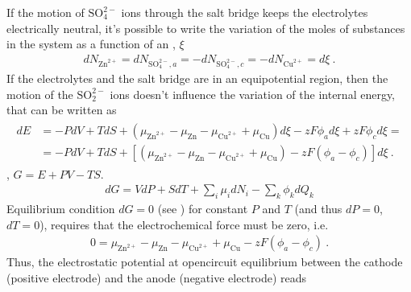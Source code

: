 \documentclass[letterpaper,10pt,english]{jupyterBook}
\begin{document}
\sphinxAtStartPar
If the motion of \(\text{SO}_4^{2-}\) ions through the salt bridge keeps the electrolytes electrically neutral, it’s possible to write the variation of the moles of substances in the system as a function of an , \(\xi\)
\begin{equation*}
\begin{split}d N_{\text{Zn}^{2+}} = d N_{\text{SO}_4^{2-}, a} = - d N_{\text{SO}_4^{2-}, c} = - dN_{\text{Cu}^{2+}} = d \xi \ .\end{split}
\end{equation*}
\sphinxAtStartPar
If the electrolytes and the salt bridge are in an equi\sphinxhyphen{}potential region, then the motion of the \(\text{SO}_2^{2-}\) ions doesn’t influence the variation of the internal energy, that can be written as
\begin{equation*}
\begin{split}\begin{aligned}
  d E
  & = - P dV + T dS + \left( \mu_{\text{Zn}^{2+}} - \mu_{\text{Zn}} - \mu_{\text{Cu}^{2+}} + \mu_{\text{Cu}} \right) d \xi - z F \phi_{a} d \xi + z F \phi_c d \xi = \\
  & = - P dV + T dS + \left[ \left( \mu_{\text{Zn}^{2+}} - \mu_{\text{Zn}} - \mu_{\text{Cu}^{2+}} + \mu_{\text{Cu}} \right) - z F \left( \phi_{a} - \phi_c \right) \right] d \xi \ .
\end{aligned}\end{split}
\end{equation*}
\sphinxAtStartPar
{}, \(G = E + PV - TS\).
\begin{equation*}
\begin{split}d G = V dP + S dT + \sum_i \mu_i dN_i - \sum_k \phi_k d Q_k\end{split}
\end{equation*}
\sphinxAtStartPar
Equilibrium condition \(d G = 0\) (see  ) for constant \(P\) and \(T\) (and thus \(d P = 0\), \(d T = 0\)), requires that the electro\sphinxhyphen{}chemical force must be zero, i.e.
\begin{equation*}
\begin{split}0 = \mu_{\text{Zn}^{2+}} - \mu_{\text{Zn}} - \mu_{\text{Cu}^{2+}} + \mu_{\text{Cu}} - z F \left( \phi_{a} - \phi_c \right) \ .\end{split}
\end{equation*}
\sphinxAtStartPar
Thus, the electrostatic potential at open\sphinxhyphen{}circuit equilibrium between the cathode (positive electrode) and the anode (negative electrode) reads
\end{document}
